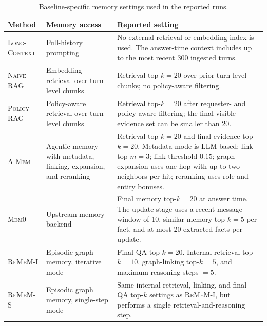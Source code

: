 \documentclass{llmxive}
\providecommand{\arraystretch}{1.22}
\begin{document}
\begin{table}[t]
\centering
\vspace{2pt}
\begingroup
\footnotesize
\setlength{\tabcolsep}{4.2pt}
\renewcommand{\arraystretch}{1.12}
\begin{tabularx}{0.98\textwidth}{
@{}
>{\arraybackslash}p{}
>{\arraybackslash}p{}
>{\arraybackslash}X
@{}}
\toprule
\rowcolor{black!6}
\textbf{Method} & \textbf{Memory access} & \textbf{Reported setting} \\
\midrule

\textsc{Long-Context}
& Full-history prompting
& No external retrieval or embedding index is used. The answer-time context includes up to the most recent 300 ingested turns. \\

\textsc{Naive RAG}
& Embedding retrieval over turn-level chunks
& Retrieval top-$k{=}20$ over prior turn-level chunks; no policy-aware filtering. \\

\textsc{Policy RAG}
& Policy-aware retrieval over turn-level chunks
& Retrieval top-$k{=}20$ after requester- and policy-aware filtering; the final visible evidence set can be smaller than 20. \\

\textsc{A-Mem}
& Agentic memory with metadata, linking, expansion, and reranking
& Retrieval top-$k{=}20$ and final evidence top-$k{=}20$. Metadata mode is LLM-based; link top-$m{=}3$; link threshold $0.15$; graph expansion uses one hop with up to two neighbors per hit; reranking uses role and entity bonuses. \\

\textsc{Mem0}
& Upstream memory backend
& Final memory top-$k{=}20$ at answer time. The update stage uses a recent-message window of 10, similar-memory top-$k{=}5$ per fact, and at most 20 extracted facts per update. \\

\textsc{ReMeM-I}
& Episodic graph memory, iterative mode
& Final QA top-$k{=}20$. Internal retrieval top-$k{=}10$, graph-linking top-$k{=}5$, and maximum reasoning steps $=5$. \\

\textsc{ReMeM-S}
& Episodic graph memory, single-step mode
& Same internal retrieval, linking, and final QA top-$k$ settings as \textsc{ReMeM-I}, but performs a single retrieval-and-reasoning step. \\

\bottomrule
\end{tabularx}
\endgroup
\caption{
Baseline-specific memory settings used in the reported runs.
}
\label{tab:baseline-memory-settings}
\end{table}
\end{document}
